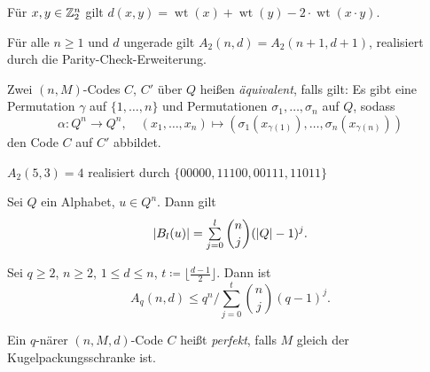 \documentclass{cheat-sheet}
\newcommand{\floor}[1]{\lfloor #1 \rfloor} %
\DeclareMathOperator{\wt}{wt} %
\begin{document}

\begin{lem}
  Für $x, y \in \mathbb{Z}_2^n$ gilt $d(x,y) = \wt(x) + \wt(y) - 2 \cdot \wt(x \cdot y)$.
\end{lem}

\begin{satz}
  Für alle $n \geq 1$ und $d$ ungerade gilt $A_2(n, d) = A_2(n+1,d+1)$, realisiert durch die Parity-Check-Erweiterung.
\end{satz}

\begin{defn}
  Zwei $(n,M)$-Codes $C$, $C'$ über $Q$ heißen \emph{äquivalent}, falls gilt:
  Es gibt eine Permutation $\gamma$ auf $\{ 1, \ldots, n \}$ und Permutationen $\sigma_1, \ldots, \sigma_n$ auf $Q$, sodass
  \[
    \alpha : Q^n \to Q^n, \quad
    (x_1, \ldots, x_n) \mapsto (\sigma_1(x_{\gamma(1)}), \ldots, \sigma_n(x_{\gamma(n)}))
  \]
  den Code $C$ auf $C'$ abbildet.
\end{defn}




\begin{bsp}
  $A_2(5, 3) = 4$ realisiert durch $\{ 00000, 11100, 00111, 11011 \}$
\end{bsp}



\begin{lem}
  Sei $Q$ ein Alphabet, $u \in Q^n$. %
  Dann gilt
  \[ \abs{B_l(u)} = \sum_{j=0}^l \binom{n}{j} (\abs{Q}-1)^j. \]
\end{lem}

\begin{satz}
  Sei $q \geq 2$, $n \geq 2$, $1 \leq d \leq n$, $t \coloneqq \floor{\tfrac{d-1}{2}}$. Dann ist
  \[ A_q(n, d) \leq q^n / \sum_{j=0}^t \binom{n}{j} (q-1)^j. \]
\end{satz}

\begin{defn}
  Ein $q$-närer $(n, M, d)$-Code $C$ heißt \emph{perfekt}, falls $M$ gleich der Kugelpackungsschranke ist.
\end{defn}

\iffalse
\begin{bsp}
  $n = 6$, $q = 2$, $d = 3$. \\
  Singleton-Schranke: $A_2(6, 3) \leq 2^{6-3+1} = 2^4 = 16$ \\
  Kugelpackungsschranke: $A_2(6, 3) \leq \floor{\frac{\floor{2^6}}{\binom{6}{0} (2-1)^0 + \binom{6}{1} (2-1)^1}} = 9$
\end{bsp}
\fi
\end{document}
